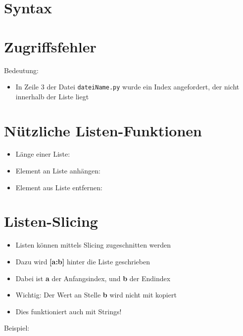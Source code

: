 \section{Syntax}
\begin{frame}
	\slidehead
\end{frame}

\section{Zugriffsfehler}
\begin{frame}
	\slidehead
	Bedeutung:
	\begin{itemize}
		\item In Zeile 3 der Datei \texttt{dateiName.py} wurde ein Index angefordert, der nicht innerhalb der Liste liegt
	\end{itemize}

\end{frame}


\section{Nützliche Listen-Funktionen}
\begin{frame}
	\slidehead
	\begin{itemize}
		\item Länge einer Liste:
	\end{itemize}
\end{frame}

\begin{frame}
	\slidehead
	\begin{itemize}
		\item Element an Liste anhängen:
		\pause
		\item Element aus Liste entfernen:
	\end{itemize}
\end{frame}

\livecoding

\section{Listen-Slicing}
\begin{frame}
	\slidehead
	\begin{itemize}
		\item Listen können mittels Slicing zugeschnitten werden
		\pause
		\item Dazu wird \textbf{[a:b]} hinter die Liste geschrieben
		\item Dabei ist \textbf{a} der Anfangsindex, und \textbf{b} der Endindex
		\pause
		\item Wichtig: Der Wert an Stelle \textbf{b} wird nicht mit kopiert
		\item Dies funktioniert auch mit Strings!
	\end{itemize}
	\pause
	\begin{block}{Beispiel:}
	\end{block}
\end{frame}

